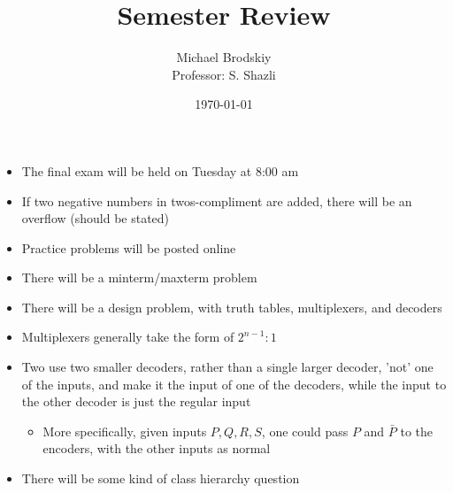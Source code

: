 


\def\code#1{\texttt{#1}}

\pagestyle{fancy}

\title{Semester Review}
\date{\today}
\author{Michael Brodskiy\\ \small Professor: S. Shazli}



\maketitle

\thispagestyle{fancy}

\newpage

\begin{itemize}

  \item The final exam will be held on Tuesday at 8:00 am

  \item If two negative numbers in twos-compliment are added, there will be an overflow (should be stated)

  \item Practice problems will be posted online

  \item There will be a minterm/maxterm problem

  \item There will be a design problem, with truth tables, multiplexers, and decoders

  \item Multiplexers generally take the form of $2^{n-1}:1$

  \item Two use two smaller decoders, rather than a single larger decoder, 'not' one of the inputs, and make it the input of one of the decoders, while the input to the other decoder is just the regular input

    \begin{itemize}

      \item More specifically, given inputs $P,Q,R,S$, one could pass $P$ and $\bar{P}$ to the encoders, with the other inputs as normal

    \end{itemize}

  \item There will be some kind of class hierarchy question

\end{itemize}



